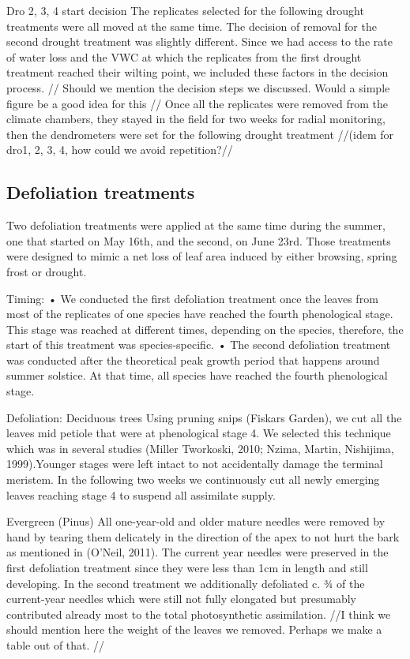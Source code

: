 \documentclass{article}
\begin{document}
	Dro 2, 3, 4 start decision
	The replicates selected for the following drought treatments were all moved at the same time. The decision of removal for the second drought treatment was slightly different. Since we had access to the rate of water loss and the VWC at which the replicates from the first drought treatment reached their wilting point, we included these factors in the decision process. // Should we mention the decision steps we discussed. Would a simple figure be a good idea for this // Once all the replicates were removed from the climate chambers, they stayed in the field for two weeks for radial monitoring, then the dendrometers were set for the following drought treatment //(idem for dro1, 2, 3, 4, how could we avoid repetition?//
	
	
	\subsection*{Defoliation treatments}
	Two defoliation treatments were applied at the same time during the summer, one that started on May 16th, and the second, on June 23rd. Those treatments were designed to mimic a net loss of leaf area induced by either browsing, spring frost or drought. 
	
	Timing:
	•	We conducted the first defoliation treatment once the leaves from most of the replicates of one species have reached the fourth phenological stage. This stage was reached at different times, depending on the species, therefore, the start of this treatment was species-specific. 
	•	The second defoliation treatment was conducted after the theoretical peak growth period that happens around summer solstice. At that time, all species have reached the fourth phenological stage. 
	
	Defoliation:
	Deciduous trees 
	Using pruning snips (Fiskars Garden), we cut all the leaves mid petiole that were at phenological stage 4. We selected this technique which was in several studies (Miller Tworkoski, 2010; Nzima, Martin, Nishijima, 1999).Younger stages were left intact to not accidentally damage the terminal meristem. In the following two weeks we continuously cut all newly emerging leaves reaching stage 4 to suspend all assimilate supply.
	
	Evergreen (Pinus)
	All one-year-old and older mature needles were removed by hand by tearing them delicately in the direction of the apex to not hurt the bark as mentioned in (O’Neil, 2011). The current year needles were preserved in the first defoliation treatment since they were less than 1cm in length and still developing. In the second treatment we additionally defoliated c. ¾ of the current-year needles which were still not fully elongated but presumably contributed already most to the total photosynthetic assimilation.
	//I think we should mention here the weight of the leaves we removed. Perhaps we make a table out of that. //
	
\end{document}
